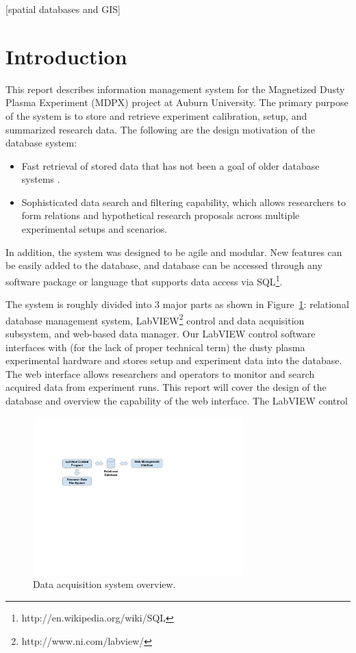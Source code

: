 \documentclass{sig-alternate}
\begin{document}
[spatial databases and GIS]

\section{Introduction}
This report describes information management system for the Magnetized Dusty Plasma Experiment (MDPX)\cite{0741-3335-54-12-124034,6414662} project at Auburn University. The primary purpose of the system is to store and retrieve experiment calibration, setup, and summarized research data. The following are the design motivation of the database system:

\begin{itemize}
\item Fast retrieval of stored data that has not been a goal of older database systems .
\item Sophisticated data search and filtering capability, which allows researchers to form relations and hypothetical research proposals across multiple experimental setups and scenarios.
\end{itemize}

In addition, the system was designed to be agile and modular. New features can be easily added to the database, and database can be accessed through any software package or language that supports data access via SQL\footnote{http://en.wikipedia.org/wiki/SQL}.

The system is roughly divided into 3 major parts as shown in Figure~\ref{fig:overview}: relational database management system, LabVIEW\footnote{http://www.ni.com/labview/} control and data acquisition subsystem, and web-based data manager. Our LabVIEW control software interfaces with (for the lack of proper technical term) the dusty plasma experimental hardware and stores setup and experiment data into the database. The web interface allows researchers and operators to monitor and search acquired data from experiment runs. This report will cover the design of the database and overview the capability of the web interface. The LabVIEW control 

\begin{figure}[h!]
\begin{center}
\includegraphics[width=3.2in]{overview.pdf}
\caption{Data acquisition system overview.\label{fig:overview}}
\end{center}
\end{figure}
\end{document}
